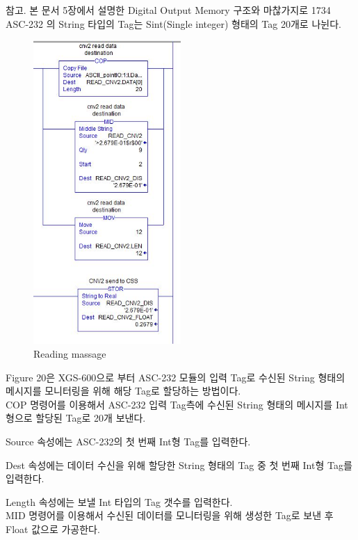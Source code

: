 \documentclass[11pt
  , a4paper
  , article
  , oneside
]{memoir}
\begin{document}
참고. 본 문서 5장에서 설명한 Digital Output Memory 구조와 마찮가지로 1734 ASC-232 의 String 타입의 Tag는 Sint(Single integer) 형태의 Tag 20개로 나뉜다.

\begin{figure}[h]
	\centering
	\includegraphics[width=0.5\textwidth]{./picture/read_ladder.JPG}
	\caption{Reading massage}
	\label{fig:}
\end{figure}

\newpage

Figure 20은 XGS-600으로 부터 ASC-232 모듈의 입력 Tag로 수신된 String 형태의 메시지를 모니터링을 위해 해당 Tag로 할당하는 방법이다.\\

COP 명령어를 이용해서 ASC-232 입력 Tag측에 수신된 String 형태의 메시지를 Int형으로 할당된 Tag로 20개 보낸다.\

Source 속성에는 ASC-232의 첫 번째 Int형 Tag를 입력한다.\

Dest 속성에는 데이터 수신을 위해 할당한 String 형태의 Tag 중 첫 번째 Int형 Tag를 입력한다.\

Length 속성에는 보낼 Int 타입의 Tag 갯수를 입력한다.\\

MID 명령어를 이용해서 수신된 데이터를 모니터링을 위해 생성한 Tag로 보낸 후 Float 값으로 가공한다.\
\end{document}

